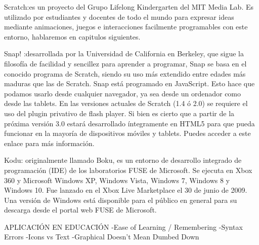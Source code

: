 Scratch:es un proyecto del Grupo Lifelong Kindergarten del MIT Media Lab.
Es utilizado por estudiantes y docentes de todo el mundo para expresar ideas mediante animaciones, juegos e interacciones facilmente programables con este entorno, hablaremos en capitulos siguientes.

Snap! :desarrollada por la Universidad de California en Berkeley, que sigue la filosofía de facilidad y sencillez para aprender a programar,  Snap se basa en el conocido programa de Scratch, siendo su uso más extendido entre edades más maduras que las de Scratch.
Snap está programado en JavaScript. Esto hace que podamos usarlo desde cualquier navegador, ya sea desde un ordenador como desde las tablets.
En las versiones actuales de Scratch (1.4 ó 2.0) se requiere el uso del plugin privativo de flash player. Si bien es cierto que a partir de la próxima versión 3.0 estará desarrollado íntegramente en HTML5 para que pueda funcionar en la mayoría de dispositivos móviles y tablets. Puedes acceder a este enlace para más información.

Kodu: originalmente llamado Boku, es un entorno de desarrollo integrado de programación (IDE) de los laboratorios FUSE de Microsoft. Se ejecuta en Xbox 360 y Microsoft Windows XP, Windows Vista, Windows 7, Windows 8 y Windows 10. Fue lanzado en el Xbox Live Marketplace el 30 de junio de 2009. Una versión de Windows está disponible para el público en general para su descarga desde el portal web FUSE de Microsoft. 

APLICACIÓN EN EDUCACIÓN
-Ease of Learning / Remembering
-Syntax Errors
-Icons vs Text
-Graphical Doesn't Mean Dumbed Down